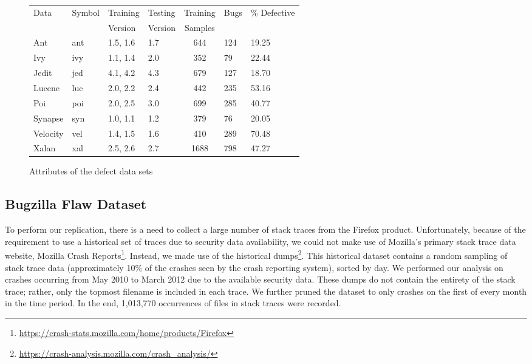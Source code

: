 \documentclass[12pt]{IEEEtran}
\begin{document}
\begin{figure}[tbp!]
	\renewcommand{\baselinestretch}{1.25}\begin{center}
		{\scriptsize
			\begin{tabular}{l@{~~~}l@{~~~}l@{~~~}l@{~~~}c@{~~~}l@{~~}l@{~~}}
				\hline
				\rowcolor[HTML]{EFEFEF}
				Data & Symbol & Training & Testing & Training& Bugs&\% {\cellcolor[HTML]{EFEFEF}Defective}\\
				\rowcolor[HTML]{EFEFEF}
				 &  & Version & Version & Samples& &\\\hline
				 
				
				Ant & ant & 1.5, 1.6  &1.7 & 644&124&19.25\\
				
				Ivy & ivy & 1.1, 1.4 & 2.0  & 352 & 79 & 22.44\\
				
				Jedit & jed & 4.1, 4.2 & 4.3 & 679 & 127 & 18.70\\
								
				Lucene & luc & 2.0, 2.2 & 2.4 & 442 & 235 & 53.16\\
				
				Poi & poi & 2.0, 2.5 & 3.0 & 699 & 285 & 40.77\\
				
				Synapse & syn & 1.0, 1.1 & 1.2 & 379 & 76 & 20.05\\
				
				Velocity & vel & 1.4, 1.5 & 1.6 & 410& 289 & 70.48\\
				
				Xalan & xal &2.5, 2.6 &2.7 & 1688 & 798 & 47.27\\\hline
			\end{tabular}}
		\end{center}
		\caption{Attributes of the defect data sets}\label{fig:attr}
	\end{figure}


\subsection{Bugzilla Flaw Dataset}

To perform our replication, there is a need to collect a large number of stack traces from the Firefox product. Unfortunately, because of the requirement to use a historical set of traces due to security data availability, we could not make use of Mozilla’s primary stack trace data website, Mozilla Crash Reports\footnote{\url{https://crash-stats.mozilla.com/home/products/Firefox}}. Instead, we made use of the historical dumps\footnote{\url{https://crash-analysis.mozilla.com/crash_analysis/}}. This historical dataset contains a random sampling of stack trace data (approximately 10\% of the crashes seen by the crash reporting system), sorted by day. We performed our analysis on crashes occurring from May 2010 to March 2012 due to the available security data. These dumps do not contain the entirety of the stack trace; rather, only the topmost filename is included in each trace. We further pruned the dataset to only crashes on the first of every month in the time period. In the end, 1,013,770 occurrences of files in stack traces were recorded.
\end{document}

